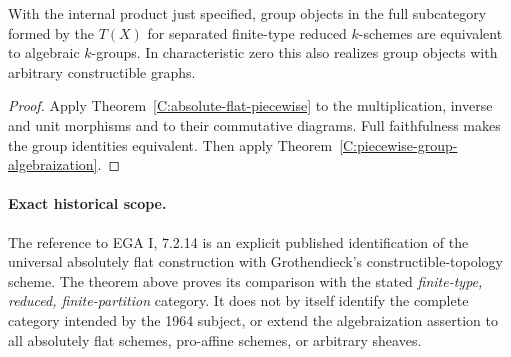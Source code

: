 \begin{corollary}\label{C:absolute-flat-group-algebraization}
With the internal product just specified, group objects in the full
subcategory formed by the $T(X)$ for separated finite-type reduced $k$-schemes
are equivalent to algebraic $k$-groups.  In characteristic zero this
also realizes group objects with arbitrary constructible graphs.
\end{corollary}

\begin{proof}
Apply Theorem~\ref{C:absolute-flat-piecewise} to the multiplication,
inverse and unit morphisms and to their commutative diagrams.  Full
faithfulness makes the group identities equivalent.  Then apply
Theorem~\ref{C:piecewise-group-algebraization}.
\end{proof}

\paragraph{Exact historical scope.}
The reference to EGA I, 7.2.14 is an explicit published identification
of the universal absolutely flat construction with Grothendieck's
constructible-topology scheme.  The theorem above proves its comparison
with the stated \emph{finite-type, reduced, finite-partition} category.
It does not by itself identify the complete category intended by the
1964 subject, or extend the algebraization assertion to all absolutely
flat schemes, pro-affine schemes, or arbitrary sheaves.
